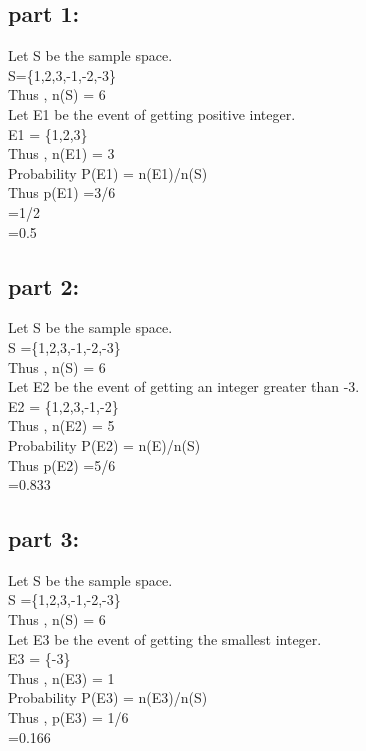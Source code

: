 \documentclass{article}
\begin{document}
\subsection{part 1:}
Let S be the sample space.\\
S=\{1,2,3,-1,-2,-3\}\\
Thus  ,   n(S) = 6\\
Let E1 be the event of getting positive integer.\\
E1 = \{1,2,3\}\\
Thus  ,  n(E1) = 3\\
Probability   P(E1) = n(E1)/n(S)\\
Thus   p(E1) =3/6\\
             =1/2\\
             =0.5
\subsection{part 2:}
Let S be the sample space.\\
S =\{1,2,3,-1,-2,-3\}\\
Thus  ,   n(S) = 6\\
Let E2 be the event of getting an integer greater than -3.\\
E2 = \{1,2,3,-1,-2\}\\
Thus  ,  n(E2) = 5\\
Probability   P(E2) = n(E)/n(S)\\
Thus   p(E2) =5/6\\
             =0.833\\
\subsection{part 3:}
Let S be the sample space.\\
S =\{1,2,3,-1,-2,-3\}\\
Thus  ,   n(S) = 6\\
Let E3 be the event of getting the smallest integer.\\
E3 = \{-3\}\\
Thus   ,  n(E3) = 1\\
Probability   P(E3) = n(E3)/n(S)\\
Thus   ,  p(E3) = 1/6\\
=0.166\\
\end{document}
